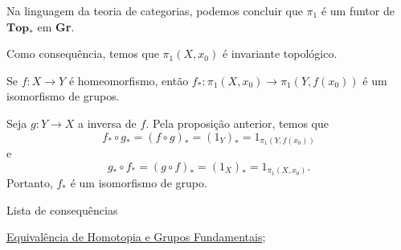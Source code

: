 Na linguagem da teoria de categorias, podemos concluir que $\pi_1$ é um funtor de $\textbf{Top}_*$ em \textbf{Gr}. 

Como consequência, temos que $\pi_1(X,x_0)$ é invariante topológico.

\begin{corol}
    Se $f:X\rightarrow Y$ é homeomorfismo, então $f_*:\pi_1 (X,x_0)\rightarrow \pi_1(Y,f(x_0))$ é um isomorfismo de grupos.
\end{corol}

\begin{dem}
    Seja $g:Y\rightarrow X$ a inversa de $f.$ Pela proposição anterior, temos que 
    $$f_*\circ g_*=(f\circ g)_*=(1_Y)_*=1_{\pi_1(Y,f(x_0))}$$
    e 
    $$g_*\circ f_*=(g\circ f)_*=(1_X)_*=1_{\pi_1 (X,x_0)}.$$
    Portanto, $f_*$ é um isomorfismo de grupo.
\end{dem}

\begin{titlemize}{Lista de consequências}
	\item \hyperref[equiv-homotopia-induz-iso]{Equivalência de Homotopia e Grupos Fundamentais};\\ %
\end{titlemize}
